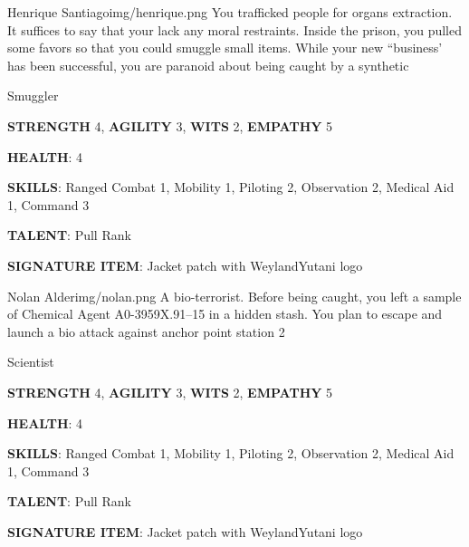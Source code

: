 \newsect

\medskip \medskip \medskip \medskip \medskip  \medskip \medskip \medskip \medskip \medskip 

\begin{rpg-pcbox}{Henrique Santiago}{img/henrique.png}
    You trafficked people for organs extraction. It suffices to say that your lack any moral restraints.
    Inside the prison, you pulled some favors so that you could smuggle small items. While your new ``business' has been successful, you are paranoid about being caught by a synthetic
\end{rpg-pcbox}

\begin{rpg-commentbox}{}
    Smuggler

    \textbf{STRENGTH} 4, \textbf{AGILITY} 3, \textbf{WITS} 2, \textbf{EMPATHY} 5

    \textbf{HEALTH}: 4

    \textbf{SKILLS}: Ranged Combat 1, Mobility 1, Piloting 2, Observation 2, Medical Aid 1, Command 3
    
    \textbf{TALENT}: Pull Rank
    
    \textbf{SIGNATURE ITEM}: Jacket patch with WeylandYutani logo    
\end{rpg-commentbox}

\newsect

\begin{rpg-pcbox}{Nolan Alder}{img/nolan.png}
    A bio-terrorist. Before being caught, you left a sample of Chemical Agent A0-3959X.91–15 in a hidden stash. You plan to escape and launch a bio attack against anchor point station 2
\end{rpg-pcbox}

\begin{rpg-commentbox}{}
    Scientist

    \textbf{STRENGTH} 4, \textbf{AGILITY} 3, \textbf{WITS} 2, \textbf{EMPATHY} 5

    \textbf{HEALTH}: 4

    \textbf{SKILLS}: Ranged Combat 1, Mobility 1, Piloting 2, Observation 2, Medical Aid 1, Command 3
    
    \textbf{TALENT}: Pull Rank
    
    \textbf{SIGNATURE ITEM}: Jacket patch with WeylandYutani logo    
\end{rpg-commentbox}

